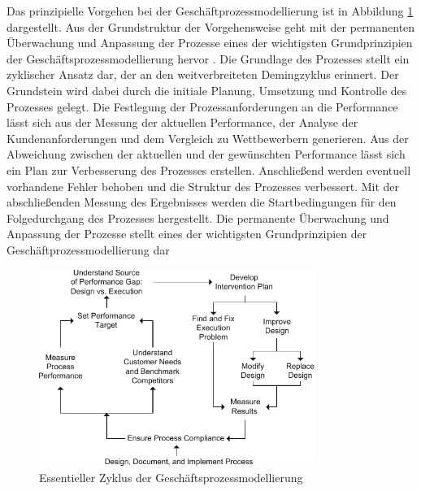 \documentclass[a4paper,12pt]{report}
\begin{document}
Das prinzipielle Vorgehen bei der Geschäftprozessmodellierung ist in Abbildung \ref{process_management_cycle} dargestellt. Aus der Grundstruktur der Vorgehensweise geht mit der permanenten Überwachung und Anpassung der Prozesse eines der wichtigsten Grundprinzipien der Geschäftsprozessmodellierung hervor \citep[vgl.][S. 11f.]{Brocke2014}. Die Grundlage des Prozesses stellt ein zyklischer Ansatz dar, der an den weitverbreiteten Demingzyklus erinnert. Der Grundstein wird dabei durch die initiale Planung, Umsetzung und Kontrolle des Prozesses gelegt. Die Festlegung der Prozessanforderungen an die Performance lässt sich aus der Messung der aktuellen Performance, der Analyse der Kundenanforderungen und dem Vergleich zu Wettbewerbern generieren. Aus der Abweichung zwischen der aktuellen und der gewünschten Performance lässt sich ein Plan zur Verbesserung des Prozesses erstellen. Anschließend werden eventuell vorhandene Fehler behoben und die Struktur des Prozesses verbessert. Mit der abschließenden Messung des Ergebnisses werden die Startbedingungen für den Folgedurchgang des Prozesses hergestellt. Die permanente Überwachung und Anpassung der Prozesse stellt eines der wichtigsten Grundprinzipien der Geschäftprozessmodellierung dar 
\begin{figure}[ht]
\centering
\includegraphics[width=0.8\textwidth]{Images/process_management_cycle.pdf}
\caption[Essentieller Zyklus der Geschäftsprozessmodellierung]{Essentieller Zyklus der Geschäftsprozessmodellierung \citep[S. 5]{Brocke2014}}
\label{process_management_cycle}
\end{figure}
\end{document}
